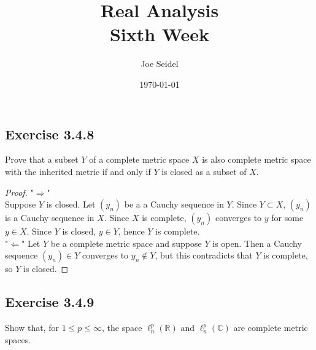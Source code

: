 \documentclass{tufte-book}
\title{Real Analysis\\Sixth Week }
\author{Joe Seidel}
\date{\today}
\theoremstyle{mytheoremstyle}
\theoremstyle{mylemstyle}
\theoremstyle{mydefstyle}
\begin{document}
\maketitle
{}
\newpage
{}

\subsection{Exercise 3.4.8}
Prove that a subset $Y$ of a complete metric space $X$ is also complete metric space with the inherited metric if and only if $Y$ is closed as a subset of $X$.

\begin{proof}"$\Rightarrow$"\\
Suppose $Y$ is closed. Let $(y_n)$ be a a Cauchy sequence in $Y$.  Since $Y \subset X$, $(y_n)$ is a Cauchy sequence in $X$.  Since $X$ is complete, $(y_n)$ converges to $y$ for some $y \in X$.  Since $Y$ is closed, $y \in Y$, hence $Y$ is complete.\\
"$\Leftarrow$" Let $Y$ be a complete metric space and suppose $Y$ is open.  Then a Cauchy sequence $(y_n) \in Y$ converges to $y_n \not\in Y$, but this contradicts that $Y$ is complete, so $Y$ is closed.

\end{proof}

\subsection{Exercise 3.4.9}
Show that, for $1 \leq p \leq \infty$, the space $\ell_n^p(\mathbb{R})$ and $\ell_n^p(\mathbb{C})$ are complete metric spaces.
\end{document}
